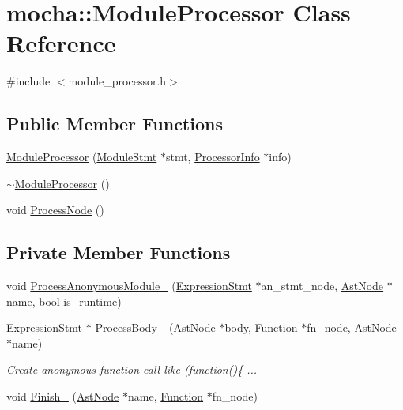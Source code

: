 \hypertarget{classmocha_1_1_module_processor}{
\section{mocha::ModuleProcessor Class Reference}
\label{classmocha_1_1_module_processor}
}


{\ttfamily \#include $<$module\_\-processor.h$>$}

\subsection*{Public Member Functions}
\begin{DoxyCompactItemize}
\item 
\hyperlink{classmocha_1_1_module_processor_abf40674dbfd4f81aedbcdb3ac2217e95}{ModuleProcessor} (\hyperlink{classmocha_1_1_module_stmt}{ModuleStmt} $\ast$stmt, \hyperlink{classmocha_1_1_processor_info}{ProcessorInfo} $\ast$info)
\item 
\hyperlink{classmocha_1_1_module_processor_a870d5d2e930db7c6ecdcd5a54972a90f}{$\sim$ModuleProcessor} ()
\item 
void \hyperlink{classmocha_1_1_module_processor_a2fe54a9198cec1533b6fd870d6667262}{ProcessNode} ()
\end{DoxyCompactItemize}
\subsection*{Private Member Functions}
\begin{DoxyCompactItemize}
\item 
void \hyperlink{classmocha_1_1_module_processor_af966919c4c55c80576c7b4dfd28227c3}{ProcessAnonymousModule\_\-} (\hyperlink{classmocha_1_1_expression_stmt}{ExpressionStmt} $\ast$an\_\-stmt\_\-node, \hyperlink{classmocha_1_1_ast_node}{AstNode} $\ast$name, bool is\_\-runtime)
\item 
\hyperlink{classmocha_1_1_expression_stmt}{ExpressionStmt} $\ast$ \hyperlink{classmocha_1_1_module_processor_a0b20d753480cfbfcb8bfaec0c90bbca5}{ProcessBody\_\-} (\hyperlink{classmocha_1_1_ast_node}{AstNode} $\ast$body, \hyperlink{classmocha_1_1_function}{Function} $\ast$fn\_\-node, \hyperlink{classmocha_1_1_ast_node}{AstNode} $\ast$name)
\begin{DoxyCompactList}\small\item\em Create anonymous function call like (function()\{ ... \end{DoxyCompactList}\item 
void \hyperlink{classmocha_1_1_module_processor_a750493ab373acfbc7b0627453469f51a}{Finish\_\-} (\hyperlink{classmocha_1_1_ast_node}{AstNode} $\ast$name, \hyperlink{classmocha_1_1_function}{Function} $\ast$fn\_\-node)
\end{DoxyCompactItemize}

